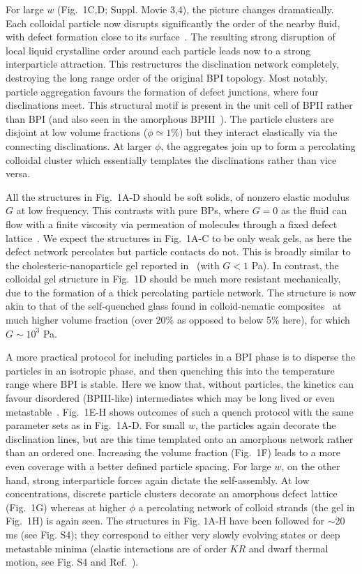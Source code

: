 \documentclass[12pt]{article}
\begin{document}
For large $w$ (Fig.~1C,D; Suppl. Movie 3,4), the picture changes dramatically.
Each colloidal particle now disrupts significantly the order of the nearby fluid, with defect formation close to its surface~\cite{stark}. The resulting strong disruption of local liquid crystalline order around each particle leads now to 
a strong interparticle attraction. This restructures the disclination
network completely, destroying the long range order of
the original BPI topology. Most notably, particle aggregation favours
the formation of defect junctions, where four disclinations meet. This structural motif is present in the unit cell of BPII rather than BPI (and also seen in the amorphous BPIII~\cite{bp3}). The particle clusters are disjoint at low volume fractions ($\phi\simeq 1\%$) but they interact elastically via the connecting disclinations. At larger $\phi$, the aggregates join up to form a percolating colloidal cluster which essentially templates the disclinations rather than vice versa. 

All the structures in Fig.~1A-D should be soft solids, of nonzero elastic 
modulus $G$ at low frequency. This contrasts with pure BPs, where
$G=0$ as the fluid can flow with a finite
viscosity via permeation of molecules through a fixed defect lattice~\cite{permeation1,permeation2}. We expect the
structures in Fig.~1A-C to be only weak gels, as here the 
defect network percolates but particle contacts do not. This is broadly similar to the cholesteric-nanoparticle gel reported
in~\cite{lubensky} (with $G<1$ Pa). In contrast, the colloidal gel
structure in Fig.~1D should be much more resistant mechanically, 
due to the formation of a thick percolating particle network. The 
structure is now akin to that of the self-quenched glass found in 
colloid-nematic composites~\cite{tiffany} at much higher volume 
fraction (over 20\% as opposed to below 5\% here), for which $G\sim 10^3$ Pa.

A more practical protocol for including particles in a BPI phase is to disperse the particles in an isotropic phase, and then quenching this into the temperature range where BPI is stable. Here we know that, without particles, the kinetics can favour disordered (BPIII-like) intermediates which may be long lived or even metastable~\cite{domaingrowth}. Fig.~1E-H shows outcomes of such a quench protocol with the same parameter sets as in Fig.~1A-D. For small $w$, the particles again decorate the disclination lines, but are this time templated onto an amorphous network rather than an ordered one.
Increasing the volume fraction (Fig.~1F) leads to a more even coverage with
a better defined particle spacing. 
For large $w$, on the other hand, strong interparticle forces again dictate
the self-assembly. At low concentrations, discrete particle clusters decorate an amorphous defect lattice (Fig.~1G) whereas at higher $\phi$ a percolating network of colloid strands (the gel in Fig.~1H) is again seen. 
The structures in Fig. 1A-H have been followed for $\sim$20 ms 
(see Fig. S4); they correspond to either very slowly evolving states or 
deep metastable minima (elastic interactions are of
order $KR$ and dwarf thermal motion, see
Fig. S4 and Ref.~\cite{stark,lavrentovich}).
\end{document}
